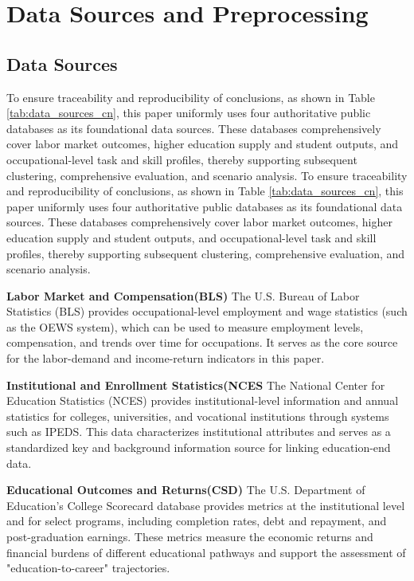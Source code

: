 \documentclass{mcmthesis}
\begin{document}
\section{Data Sources and Preprocessing}

\subsection{Data Sources}
\noindent To ensure traceability and reproducibility of conclusions, as shown in Table \ref{tab:data_sources_cn}, this paper uniformly uses four authoritative public databases as its foundational data sources. These databases comprehensively cover labor market outcomes, higher education supply and student outputs, and occupational-level task and skill profiles, thereby supporting subsequent clustering, comprehensive evaluation, and scenario analysis. To ensure traceability and reproducibility of conclusions, as shown in Table \ref{tab:data_sources_cn}, this paper uniformly uses four authoritative public databases as its foundational data sources. These databases comprehensively cover labor market outcomes, higher education supply and student outputs, and occupational-level task and skill profiles, thereby supporting subsequent clustering, comprehensive evaluation, and scenario analysis.

\noindent\textbf{Labor Market and Compensation(BLS)}
The U.S. Bureau of Labor Statistics (BLS) provides occupational-level employment and wage statistics (such as the OEWS system), which can be used to measure employment levels, compensation, and trends over time for occupations. It serves as the core source for the labor-demand and income-return indicators in this paper.

\noindent\textbf{Institutional and Enrollment Statistics(NCES} The National Center for Education Statistics (NCES) provides institutional-level information and annual statistics for colleges, universities, and vocational institutions through systems such as IPEDS. This data characterizes institutional attributes and serves as a standardized key and background information source for linking education-end data.

\noindent\textbf{Educational Outcomes and Returns(CSD)} The U.S. Department of Education's College Scorecard database provides metrics at the institutional level and for select programs, including completion rates, debt and repayment, and post-graduation earnings. These metrics measure the economic returns and financial burdens of different educational pathways and support the assessment of "education-to-career" trajectories.
\end{document}
